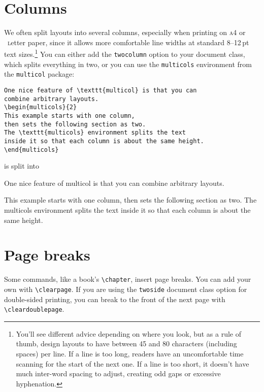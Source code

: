 \section{Columns}

We often split layouts into several columns, especially when printing on
\textsc{a4} or ~\textsc{l}etter paper,
since it allows more comfortable line widths at standard
8--12\,pt text sizes.\punckern\footnote{You'll see different advice depending
on where you look, but as a rule of thumb, design layouts to have
between 45 and 80 characters (including spaces) per line.
If a line is too long, readers have an uncomfortable time scanning for
the start of the next one.
If a line is too short, it doesn't have much inter-word spacing to adjust,
creating odd gaps or excessive hyphenation.}
You can either add the \texttt{twocolumn} option to your document class,
which splits everything in two, or you can use the \texttt{multicols}
environment from the \texttt{multicol} package:
\begin{leftfigure}
\begin{lstlisting}
One nice feature of \texttt{multicol} is that you can
combine arbitrary layouts.
\begin{multicols}{2}
This example starts with one column,
then sets the following section as two.
The \texttt{multicols} environment splits the text
inside it so that each column is about the same height.
\end{multicols}
\end{lstlisting}
\end{leftfigure}
is split into
\begin{leftfigure}
\lm%
One nice feature of {\lt multicol} is that you can
combine arbitrary layouts.
\begin{multicols}{2}
This example starts with one column,
then sets the following section as two.
The \mbox{\lt multicols} environment splits the text
inside it so that each column is about the same height.
\end{multicols}
\end{leftfigure}

\section{Page breaks}

Some commands, like a book's \verb|\chapter|, insert page breaks.
You can add your own with \verb|\clearpage|.
If you are using the \texttt{twoside} document class option for double-sided
printing, you can break to the front of the next page with
\verb|\cleardoublepage|.

